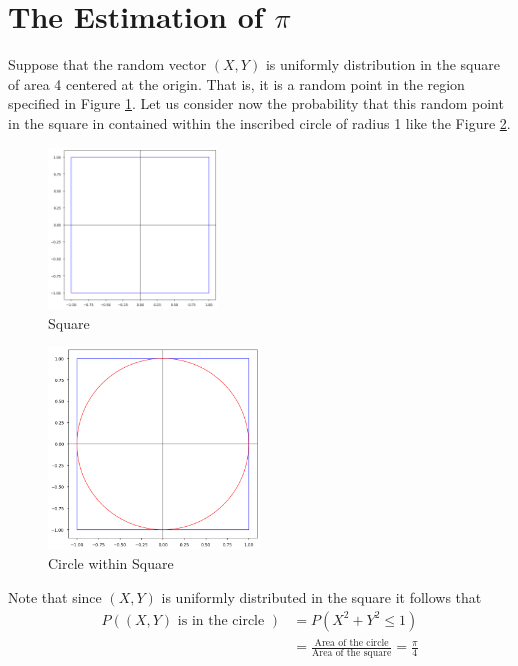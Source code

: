 \section{The Estimation of $\pi$}
Suppose that the random vector $(X,Y)$ is uniformly distribution in the square of area 4
centered at the origin. That is, it is a random point in the region specified in Figure \ref{Square}.
Let us consider now the probability that this random point in the square in contained within the inscribed circle of radius 1
like the Figure \ref{Circle within Square}.

\begin{figure}[H]
	\centering
	\includegraphics[width=0.4\textwidth]{images/square.png}
	\caption{Square}
	\label{Square}
\end{figure}

\begin{figure}[H]
	\centering
	\includegraphics[width=0.5\textwidth]{images/circle.png}
	\caption{Circle within Square}
	\label{Circle within Square}
\end{figure}

Note that since $(X,Y)$ is uniformly distributed in the square it follows that
\begin{align*}
	P((X,Y) \text{ is in the circle } ) & = P(X ^{2}+ Y ^{2}\le 1)                                                        \\
	                                    & = \frac{\text{Area of the circle} }{\text{Area of the square} } = \frac{\pi}{4}
\end{align*}

